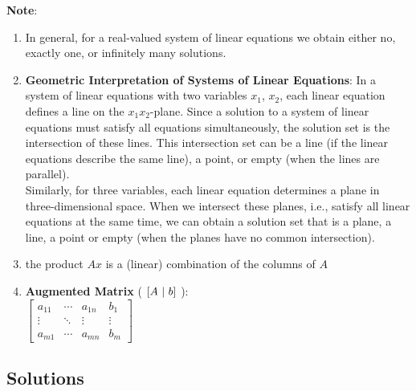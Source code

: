\begin{enumerate}[itemsep=0.3cm]
    
    
\end{enumerate}


\vspace{0.5cm}
\textbf{Note}:
\begin{enumerate}[itemsep=0.2cm]
    \item In general, for a real-valued system of linear equations we obtain either no, exactly one, or infinitely many solutions. 
    \hfill \cite{mfml/book/mml/Deisenroth-Faisal-Ong}

    \item \textbf{Geometric Interpretation of Systems of Linear Equations}: 
    In a system of linear equations with two variables $x_1$, $x_2$, each linear equation defines a line on the $x_1x_2$-plane. Since a solution to a system of linear equations must satisfy all equations simultaneously, the solution set is the intersection of these lines. This intersection set can be a line (if the linear equations describe the same line), a point, or empty (when the lines are parallel).
    \hfill \cite{mfml/book/mml/Deisenroth-Faisal-Ong}
    \\
    Similarly, for three variables, each linear equation determines a plane in three-dimensional space. When we intersect these planes, i.e., satisfy all linear equations at the same time, we can obtain a solution set that is a plane, a line, a point or empty (when the planes have no common intersection).
    \hfill \cite{mfml/book/mml/Deisenroth-Faisal-Ong}

    \item the product $Ax$ is a (linear) combination of the columns of $A$
    \hfill \cite{mfml/book/mml/Deisenroth-Faisal-Ong}

    \item \textbf{Augmented Matrix} ( $\left[A\ |\ b\right]$ ): 
    \\[0.2cm]
    $
        \left[
        \begin{array}{ccc|c}
            a_{11} & \cdots & a_{1n} & b_{1}\\
            \vdots & \ddots & \vdots & \vdots \\
            a_{m1} & \cdots & a_{mn} & b_{m}
        \end{array}
        \right]
    $
\end{enumerate}








\subsection{Solutions}

